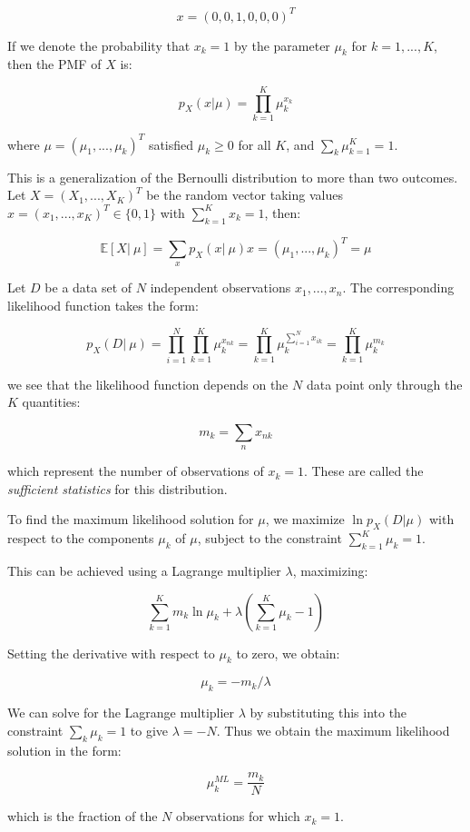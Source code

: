 \documentclass{article}
\begin{document}
\[x=(0, 0, 1, 0, 0, 0)^T\]

If we denote the probability that \(x_k = 1\) by the parameter \(\mu_k\)
for \(k = 1,
..., K\), then the PMF of \(X\) is:

\[p_X(x|\mu) = \prod_{k=1}^K \mu_k^{x_k}\]

where \(\mu = (\mu_1, ..., \mu_k)^T\) satisfied \(\mu_k \ge 0\) for all
\(K\), and \(\sum_k \mu_{k=1}^K = 1\).

This is a generalization of the Bernoulli distribution to more than two
outcomes. Let \(X = (X_1, ..., X_K)^T\) be the random vector taking
values \(x =
(x_1, ..., x_K)^T \in \{0, 1\}\) with \(\sum_{k=1}^K x_k = 1\), then:

\[\mathbb{E}[X|\ \mu] = \sum_x p_X(x|\ \mu) x = (\mu_1, ..., \mu_k)^T = \mu\]

Let \(D\) be a data set of \(N\) independent observations
\(x_1, ..., x_n\). The corresponding likelihood function takes the form:

\[p_X(D|\ \mu) = \prod_{i=1}^N \prod_{k=1}^K \mu_k^{x_{nk}} = \prod_{k=1}^K
\mu_k^{\sum_{i=1}^N x_{ik}} = \prod_{k=1}^K \mu_k^{m_k}\]

we see that the likelihood function depends on the \(N\) data point only
through the \(K\) quantities:

\[m_k = \sum_n x_{nk}\]

which represent the number of observations of \(x_k = 1\). These are
called the \emph{sufficient statistics} for this distribution.

To find the maximum likelihood solution for \(\mu\), we maximize
\(\ln p_X(D|\mu)\) with respect to the components \(\mu_k\) of \(\mu\),
subject to the constraint \(\sum_{k=1}^K \mu_k = 1\).

This can be achieved using a Lagrange multiplier \(\lambda\),
maximizing:

\[\sum_{k=1}^K m_k \ln \mu_k + \lambda (\sum_{k=1}^K \mu_k - 1)\]

Setting the derivative with respect to \(\mu_k\) to zero, we obtain:

\[\mu_k = -m_k / \lambda\]

We can solve for the Lagrange multiplier \(\lambda\) by substituting
this into the constraint \(\sum_k \mu_k = 1\) to give \(\lambda = - N\).
Thus we obtain the maximum likelihood solution in the form:

\[\mu_k^{ML} = \frac{m_k}{N}\]

which is the fraction of the \(N\) observations for which \(x_k = 1\).
\end{document}

